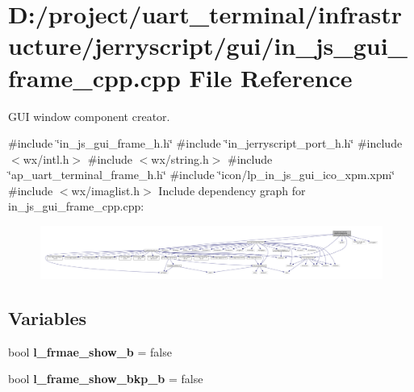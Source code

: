 \section{D\+:/project/uart\+\_\+terminal/infrastructure/jerryscript/gui/in\+\_\+js\+\_\+gui\+\_\+frame\+\_\+cpp.cpp File Reference}
\label{in__js__gui__frame__cpp_8cpp}


G\+UI window component creator.  


{\ttfamily \#include \char`\"{}in\+\_\+js\+\_\+gui\+\_\+frame\+\_\+h.\+h\char`\"{}}\newline
{\ttfamily \#include \char`\"{}in\+\_\+jerryscript\+\_\+port\+\_\+h.\+h\char`\"{}}\newline
{\ttfamily \#include $<$wx/intl.\+h$>$}\newline
{\ttfamily \#include $<$wx/string.\+h$>$}\newline
{\ttfamily \#include \char`\"{}ap\+\_\+uart\+\_\+terminal\+\_\+frame\+\_\+h.\+h\char`\"{}}\newline
{\ttfamily \#include \char`\"{}icon/lp\+\_\+in\+\_\+js\+\_\+gui\+\_\+ico\+\_\+xpm.\+xpm\char`\"{}}\newline
{\ttfamily \#include $<$wx/imaglist.\+h$>$}\newline
Include dependency graph for in\+\_\+js\+\_\+gui\+\_\+frame\+\_\+cpp.\+cpp\+:\nopagebreak
\begin{figure}[H]
\begin{center}
\leavevmode
\includegraphics[width=350pt]{in__js__gui__frame__cpp_8cpp__incl}
\end{center}
\end{figure}
\subsection*{Variables}
\begin{DoxyCompactItemize}
\item 
bool \textbf{ l\+\_\+frmae\+\_\+show\+\_\+b} = false
\item 
bool {\bfseries l\+\_\+frame\+\_\+show\+\_\+bkp\+\_\+b} = false
\end{DoxyCompactItemize}


